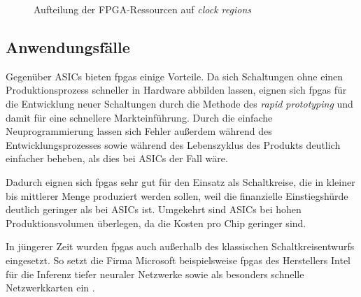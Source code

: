 \begin{figure}[htb]
    \centering
    \caption{Aufteilung der FPGA-Ressourcen auf \textit{clock regions}
             \cite[nach][22]{ultrascale2019}}
    \label{fpga:aufbau:clockregions}
\end{figure}

\subsection{Anwendungsfälle}

Gegenüber ASICs bieten \gls{fpga}s einige Vorteile. Da sich Schaltungen ohne
einen Produktionsprozess schneller in Hardware abbilden lassen, eignen sich
\gls{fpga}s für die Entwicklung neuer Schaltungen durch die Methode des
\textit{rapid prototyping} und damit für eine schnellere Markteinführung. Durch
die einfache Neuprogrammierung lassen sich Fehler außerdem während des
Entwicklungsprozesses sowie während des Lebenszyklus des Produkts deutlich
einfacher beheben, als dies bei ASICs der Fall wäre.
\cite[vgl.][10-1]{hawkins2010}

Dadurch eignen sich \gls{fpga}s sehr gut für den Einsatz als Schaltkreise, die
in kleiner bis mittlerer Menge produziert werden sollen, weil die finanzielle
Einstiegshürde deutlich geringer als bei ASICs ist. Umgekehrt sind ASICs bei
hohen Produktionsvolumen überlegen, da die Kosten pro Chip geringer sind.
\cite[vgl.][10-2]{hawkins2010}

In jüngerer Zeit wurden \gls{fpga}s auch außerhalb des klassischen
Schaltkreisentwurfs eingesetzt. So setzt die Firma Microsoft beispielsweise
\gls{fpga}s des Herstellers Intel für die Inferenz tiefer neuraler Netzwerke
\cite[vgl.][]{fowers2018, chung2018} sowie als besonders schnelle
Netzwerkkarten ein \cite[vgl.][]{firestone2018}.

